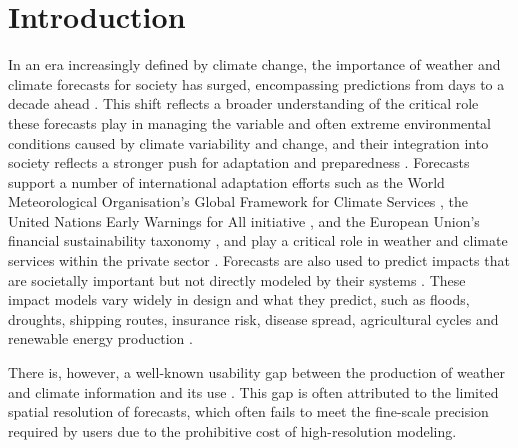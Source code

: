 \documentclass[preprint,12pt,authoryear]{elsarticle}
\begin{document}
\section{Introduction}


In an era increasingly defined by climate change, the importance of weather and climate forecasts for society has surged, encompassing predictions from days to a decade ahead \citep{Merryfield2020, White2022, Okane2023}. This shift reflects a broader understanding of the critical role these forecasts play in managing the variable and often extreme environmental conditions caused by climate variability and change, and their integration into society reflects a stronger push for adaptation and preparedness \citep{Goddard2016, Trenberth2016, CoughlanDePerez2022}. Forecasts support a number of international adaptation efforts such as the World Meteorological Organisation's Global Framework for Climate Services \citep{Hewitt2012}, the United Nations Early Warnings for All initiative \citep[EW4ALL,][]{EW4ALL}, and the European Union's financial sustainability taxonomy \citep{Taxonomy2020}, and play a critical role in weather and climate services within the private sector \citep{Cusick2019, Lam2023, Price2024}. Forecasts are also used to predict impacts that are societally important but not directly modeled by their systems \citep{Merz2020}. These impact models vary widely in design and what they predict, such as floods, droughts, shipping routes, insurance risk, disease spread, agricultural cycles and renewable energy production \citep[e.g.,][]{Torralba2017, Roosli2021, Graham2022, Haupt2018, haupt2019a, haupt2019b}.

 

There is, however, a well-known usability gap between the production of weather and climate information and its use \citep{Lemos2012, Vandenhurk2018, Findlater2021}. This gap is often attributed to the limited spatial resolution of forecasts, which often fails to meet the fine-scale precision required by users due to the prohibitive cost of high-resolution modeling. 



\end{document}
